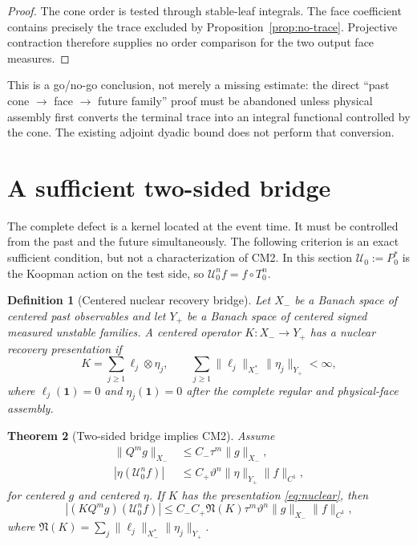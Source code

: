 \documentclass[11pt]{article}
\newtheorem{theorem}{Theorem}[section]
\newtheorem{definition}[theorem]{Definition}
\newcommand{\cU}{\mathcal U}
\newcommand{\one}{\mathbf 1}
\begin{document}
\begin{proof}
The cone order is tested through stable-leaf integrals.  The face coefficient
contains precisely the trace excluded by Proposition~\ref{prop:no-trace}.
Projective contraction therefore supplies no order comparison for the two
output face measures.
\end{proof}

This is a go/no-go conclusion, not merely a missing estimate: the direct
``past cone $\to$ face $\to$ future family'' proof must be abandoned unless
physical assembly first converts the terminal trace into an integral
functional controlled by the cone.  The existing adjoint dyadic bound does
not perform that conversion.

\section{A sufficient two-sided bridge}

The complete defect is a kernel located at the event time.  It must be
controlled from the past and the future simultaneously.  The following
criterion is an exact sufficient condition, but not a characterization of
CM2.
In this section $\cU_0:=P_0^*$ is the Koopman action on the test side, so
$\cU_0^nf=f\circ T_0^n$.

\begin{definition}[Centered nuclear recovery bridge]
Let $X_-$ be a Banach space of centered past observables and let $Y_+$ be a
Banach space of centered signed measured unstable families.  A centered
operator $K:X_-\to Y_+$ has a nuclear recovery presentation if
\begin{equation}
\label{eq:nuclear}
 K=\sum_{j\ge1}\ell_j\otimes\eta_j,
 \qquad
 \sum_{j\ge1}\|\ell_j\|_{X_-^*}\|\eta_j\|_{Y_+}<\infty,
\end{equation}
where $\ell_j(\one)=0$ and $\eta_j(\one)=0$ after the complete regular and
physical-face assembly.
\end{definition}

\begin{theorem}[Two-sided bridge implies CM2]
\label{thm:bridge}
Assume
\begin{align}
 \|Q^mg\|_{X_-}&\le C_-\tau^m\|g\|_{X_-},
       \label{eq:past}\\
 |\eta(\cU_0^nf)|&\le C_+\vartheta^n
       \|\eta\|_{Y_+}\|f\|_{C^1},\label{eq:future}
\end{align}
for centered $g$ and centered $\eta$.  If $K$ has the presentation
\eqref{eq:nuclear}, then
\[
 |(KQ^mg)(\cU_0^nf)|
 \le C_-C_+\mathfrak N(K)\tau^m\vartheta^n
       \|g\|_{X_-}\|f\|_{C^1},
\]
where
$\mathfrak N(K)=\sum_j\|\ell_j\|_{X_-^*}\|\eta_j\|_{Y_+}$.
\end{theorem}
\end{document}

